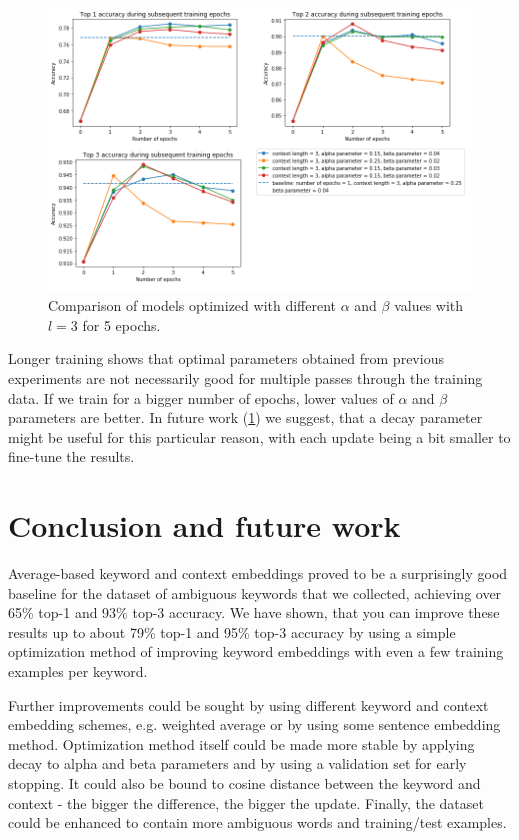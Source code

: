 \documentclass{llncs}
\begin{document}
\begin{figure}
    \centering
    \caption{Comparison of models optimized with different \(\alpha\) and \(\beta\) values with \(l=3\) for 5 epochs.}
    \label{fig:exp4_2_epochs_comparison}
    \includegraphics[scale=0.65]{res/exp4_epoch_multiconfiguration_top_acc.png}
\end{figure}

Longer training shows that optimal parameters obtained from previous experiments are not necessarily good for multiple passes through the training data.
If we train for a bigger number of epochs, lower values of \(\alpha\) and \(\beta\) parameters are better.
In future work (\ref{sec:conclusion}) we suggest, that a decay parameter might be useful for this particular reason, with each update being a bit smaller to fine-tune the results.


\section{Conclusion and future work}
\label{sec:conclusion}

Average-based keyword and context embeddings proved to be a surprisingly good baseline for the dataset of ambiguous keywords that we collected, achieving over 65\% top-1 and 93\% top-3 accuracy.
We have shown, that you can improve these results up to about 79\% top-1 and 95\% top-3 accuracy by using a simple optimization method of improving keyword embeddings with even a few training examples per keyword.

Further improvements could be sought by using different keyword and context embedding schemes, e.g. weighted average or by using some sentence embedding method. Optimization method itself could be made more stable by applying decay to alpha and beta parameters and by using a validation set for early stopping. It could also be bound to cosine distance between the keyword and context - the bigger the difference, the bigger the update. Finally, the dataset could be enhanced to contain more ambiguous words and training/test examples.



\end{document}
